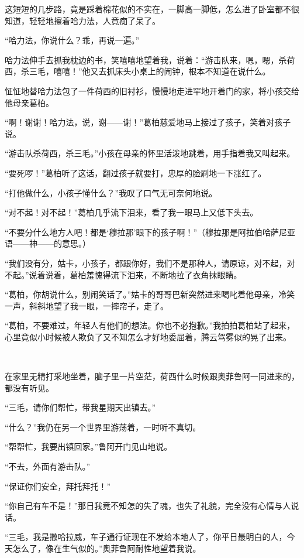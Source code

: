 \par 这短短的几步路，竟是踩着棉花似的不实在，一脚高一脚低，怎么进了卧室都不很知道，轻轻地擦着哈力法，人竟痴了呆了。
\par “哈力法，你说什么？乖，再说一遍。”
\par 哈力法伸手去抓我枕边的书，笑嘻嘻地望着我，说着：“游击队来，嗯，嗯，杀荷西，杀三毛，嘻嘻！”他又去抓床头小桌上的闹钟，根本不知道在说什么。
\par 怔怔地替哈力法包了一件荷西的旧衬衫，慢慢地走进罕地开着门的家，将小孩交给他母亲葛柏。
\par “啊！谢谢！哈力法，说，谢——谢！”葛柏慈爱地马上接过了孩子，笑着对孩子说。
\par “游击队杀荷西，杀三毛。”小孩在母亲的怀里活泼地跳着，用手指着我又叫起来。
\par “要死啰！”葛柏听了这话，翻过孩子就要打，忠厚的脸刷地一下涨红了。
\par “打他做什么，小孩子懂什么？”我叹了口气无可奈何地说。
\par “对不起！对不起！”葛柏几乎流下泪来，看了我一眼马上又低下头去。
\par “不要分什么地方人吧！都是‘穆拉那’眼下的孩子啊！”（穆拉那是阿拉伯哈萨尼亚语——神——的意思。）
\par “我们没有分，姑卡，小孩子，都跟你好，我们不是那种人，请原谅，对不起，对不起。”说着说着，葛柏羞愧得流下泪来，不断地拉了衣角抹眼睛。
\par “葛柏，你胡说什么，别闹笑话了。”姑卡的哥哥巴新突然进来喝叱着他母亲，冷笑一声，斜斜地望了我一眼，一摔帘子，走了。
\par “葛柏，不要难过，年轻人有他们的想法。你也不必抱歉。”我拍拍葛柏站了起来，心里竟似小时候被人欺负了又不知怎么才好地委屈着，腾云驾雾似的晃了出来。
\par  
\par 在家里无精打采地坐着，脑子里一片空茫，荷西什么时候跟奥菲鲁阿一同进来的，都没有听见。
\par “三毛，请你们帮忙，带我星期天出镇去。”
\par “什么？”我仍在另一个世界里游荡着，一时听不真切。
\par “帮帮忙，我要出镇回家。”鲁阿开门见山地说。
\par “不去，外面有游击队。”
\par “保证你们安全，拜托拜托！”
\par “你自己有车不是！”那日我竟不知怎的失了魂，也失了礼貌，完全没有心情与人说话。
\par “三毛，我是撒哈拉威，车子通行证现在不发给本地人了，你平日最明白的人，今天怎么了，像在生气似的。”奥菲鲁阿耐性地望着我说。
